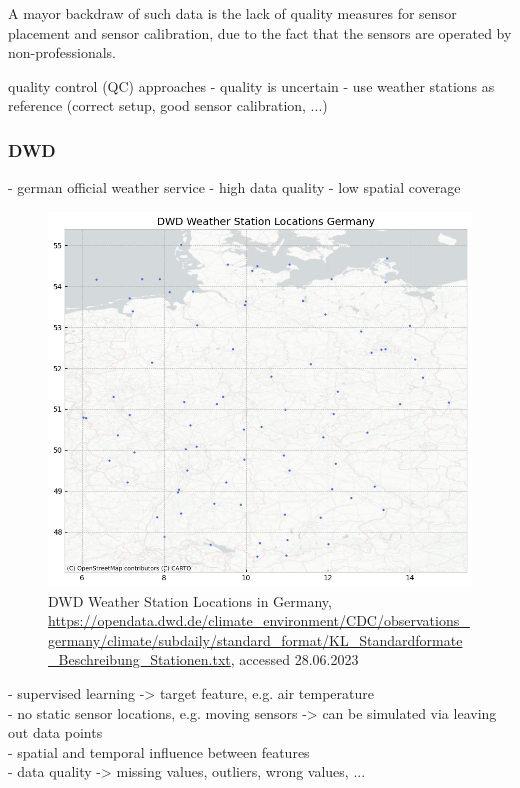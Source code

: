 A mayor backdraw of such data is the lack of quality measures for sensor placement and sensor calibration, due to the fact that the sensors are operated by non-professionals.

quality control (QC) approaches
- quality is uncertain
- use weather stations as reference (correct setup, good sensor calibration, ...)

\subsubsection{DWD}

- german official weather service
- high data quality
- low spatial coverage

\begin{figure}[ht]
    \centering
    \includegraphics[width=1\textwidth]{images/dwd_weather_station_locations_germany.png}
    \caption{DWD Weather Station Locations in Germany, \url{https://opendata.dwd.de/climate_environment/CDC/observations_germany/climate/subdaily/standard_format/KL_Standardformate_Beschreibung_Stationen.txt}, accessed 28.06.2023}
    \label{fig:dwd sensor locations germany}
\end{figure}

- supervised learning -> target feature, e.g. air temperature\\
- no static sensor locations, e.g. moving sensors -> can be simulated via leaving out data points\\
- spatial and temporal influence between features\\
- data quality -> missing values, outliers, wrong values, ...\\

